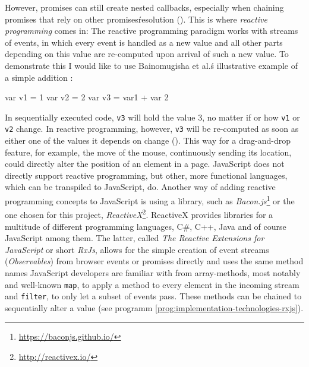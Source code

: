 However, promises can still create nested callbacks, especially when chaining promises that rely on other promises\' resolution (\cite{reactive-vs-promises}). This is where \emph{reactive programming} comes in: The reactive programming paradigm works with streams of events, in which every event is handled as a new value and all other parts depending on this value are re-computed upon arrival of such a new value. To demonstrate this I would like to use Bainomugisha et al.\'s illustrative example of a simple addition \cite{reactive-programming-survey}:

\begin{JsCode}
var v1 = 1
var v2 = 2
var v3 = var1 + var 2
\end{JsCode}
%
In sequentially executed code, \texttt{v3} will hold the value $3$, no matter if or how \texttt{v1} or \texttt{v2} change. In reactive programming, however, \texttt{v3} will be re-computed as soon as either one of the values it depends on change (\cite{reactive-programming-survey}). This way for a drag-and-drop feature, for example, the move of the mouse, continuously sending its location, could directly alter the position of an element in a page. JavaScript does not directly support reactive programming, but other, more functional languages, which can be transpiled to JavaScript, do. Another way of adding reactive programming concepts to JavaScript is using a library, such as \emph{Bacon.js}\footnote{\url{https://baconjs.github.io/}} or the one chosen for this project, \emph{ReactiveX}\footnote{\url{http://reactivex.io/}}. ReactiveX provides libraries for a multitude of different programming languages, C#, C++, Java and of course JavaScript among them. The latter, called \emph{The Reactive Extensions for JavaScript} or short \emph{RxJs}, allows for the simple creation of event streams (\emph{Observables}) from browser events or promises directly and uses the same method names JavaScript developers are familiar with from array-methods, most notably and well-known \texttt{map}, to apply a method to every element in the incoming stream and \texttt{filter}, to only let a subset of events pass. These methods can be chained to sequentially alter a value (see programm \ref{prog:implementation-technologies-rxjs}).


